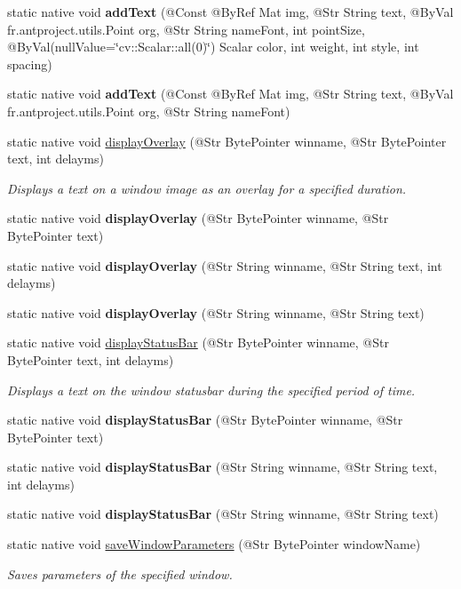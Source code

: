\begin{DoxyCompactItemize}
static native void {\bfseries add\+Text} (@Const @By\+Ref Mat img, @Str String text, @By\+Val fr.antproject.utils.Point org, @Str String name\+Font, int point\+Size, @By\+Val(null\+Value=\char`\"{}cv\+::\+Scalar\+::all(0)\char`\"{}) Scalar color, int weight, int style, int spacing)
\item 
static native void {\bfseries add\+Text} (@Const @By\+Ref Mat img, @Str String text, @By\+Val fr.antproject.utils.Point org, @Str String name\+Font)
\item 
static native void \hyperlink{group__highgui__qt_ga70784449604551e57ffd968370f887a8}{display\+Overlay} (@Str Byte\+Pointer winname, @Str Byte\+Pointer text, int delayms)
\begin{DoxyCompactList}\small\item\em Displays a text on a window image as an overlay for a specified duration. \end{DoxyCompactList}\item 
static native void {\bfseries display\+Overlay} (@Str Byte\+Pointer winname, @Str Byte\+Pointer text)
\item 
static native void {\bfseries display\+Overlay} (@Str String winname, @Str String text, int delayms)
\item 
static native void {\bfseries display\+Overlay} (@Str String winname, @Str String text)
\item 
static native void \hyperlink{group__highgui__qt_ga50de3d06722cc9fbc0054f3c83902f1f}{display\+Status\+Bar} (@Str Byte\+Pointer winname, @Str Byte\+Pointer text, int delayms)
\begin{DoxyCompactList}\small\item\em Displays a text on the window statusbar during the specified period of time. \end{DoxyCompactList}\item 
static native void {\bfseries display\+Status\+Bar} (@Str Byte\+Pointer winname, @Str Byte\+Pointer text)
\item 
static native void {\bfseries display\+Status\+Bar} (@Str String winname, @Str String text, int delayms)
\item 
static native void {\bfseries display\+Status\+Bar} (@Str String winname, @Str String text)
\item 
static native void \hyperlink{group__highgui__qt_gac1ea25caaa8647ae67972ac417776344}{save\+Window\+Parameters} (@Str Byte\+Pointer window\+Name)
\begin{DoxyCompactList}\small\item\em Saves parameters of the specified window. \end{DoxyCompactList}\item 

\end{DoxyCompactItemize}
